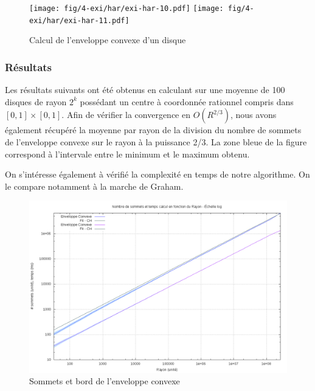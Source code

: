 \begin{figure}[H]
  \centering
  \texttt{[image: fig/4-exi/har/exi-har-10.pdf]}
  \texttt{[image: fig/4-exi/har/exi-har-11.pdf]}
  \caption{Calcul de l'enveloppe convexe d'un disque}
\end{figure}

\subsubsection{Résultats}

Les résultats suivants ont été obtenus en calculant sur une moyenne de 100 disques de rayon $2^k$ possédant un centre à coordonnée rationnel compris dans $[0,1]\times[0,1]$. Afin de vérifier la convergence en $O(R^{2/3})$, nous avons également récupéré la moyenne par rayon de la division du nombre de sommets de l'enveloppe convexe sur le rayon à la puissance 2/3. La zone bleue de la figure correspond à l'intervale entre le minimum et le maximum obtenu.

On s'intéresse également à vérifié la complexité en temps de notre algorithme. On le compare notamment à la marche de Graham. 

\begin{figure}[H]
  \centering
  \includegraphics[width=\linewidth]{fig/4-exi/ch/exi-ch-sommet.png}
  \caption{Sommets et bord de l'enveloppe convexe}
\end{figure}

